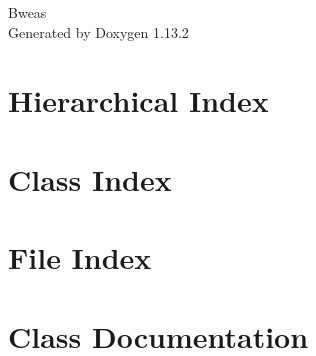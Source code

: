 \documentclass[twoside]{book}
\newcommand{\+}{\discretionary{\mbox{\scriptsize$\hookleftarrow$}}{}{}}
\newcommand{\clearemptydoublepage}{%
    \newpage{\pagestyle{empty}\cleardoublepage}%
  }
\begin{document}
  \raggedbottom
    \hypersetup{pageanchor=false,
                bookmarksnumbered=true,
                pdfencoding=unicode
               }
  \begin{titlepage}
  \vspace*{7cm}
  \begin{center}%
  {\Large Bweas}\\
  \vspace*{1cm}
  {\large Generated by Doxygen 1.13.2}\\
  \end{center}
  \end{titlepage}
  \clearemptydoublepage
  \tableofcontents
  \clearemptydoublepage
  \hypersetup{pageanchor=true}
\chapter{Hierarchical Index}

\chapter{Class Index}

\chapter{File Index}

\chapter{Class Documentation}






























\end{document}
